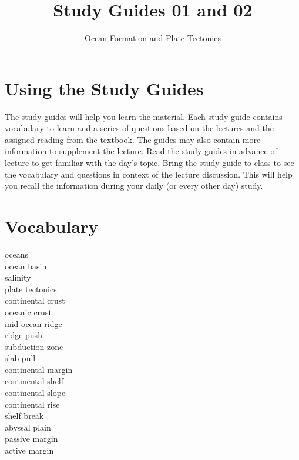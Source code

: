\documentclass[nofonts, letterpaper]{tufte-handout}
\title{Study Guides 01 and 02}%
\author{Ocean Formation and Plate Tectonics}
\date{} %
\begin{document}
\maketitle	%


\section{Using the Study Guides}
The study guides will help you learn the material.  Each study guide contains vocabulary to learn and a series of questions based on the lectures and the assigned reading from the textbook.  The guides may also contain more information to supplement the lecture.  Read the study guides in advance of lecture to get familiar with the day's topic. Bring the study guide to class to see the vocabulary and questions in context of the lecture discussion.  This will help you recall the information during your daily (or every other day) study.

\section{Vocabulary}
\vspace{-1\baselineskip}
\begin{multicols}{2}
oceans\\
ocean basin\\
salinity \\
plate tectonics\\
continental crust\\
oceanic crust\\
mid-ocean ridge\\
ridge push\\
subduction zone\\
slab pull\\
continental margin\\
continental shelf\\
continental slope\\
continental rise\\
shelf break\\
abyssal plain\\
passive margin\\
active margin\\
\end{multicols}
\end{document}
